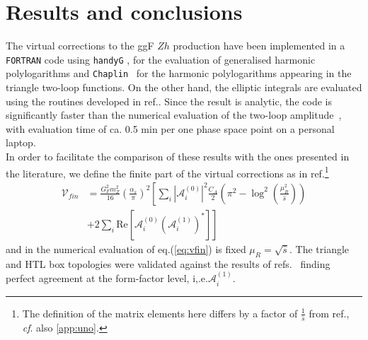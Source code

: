 \section{Results and conclusions} \label{sec:hzres}
The virtual corrections to the ggF $Zh$ production have been implemented in a  \texttt{FORTRAN} code using  \texttt{handyG} \cite{Naterop:2019xaf}, for the evaluation of generalised harmonic polylogarithms and \texttt{Chaplin}~\cite{Buehler:2011ev} for the harmonic polylogarithms appearing in the triangle two-loop functions. 
On the other hand, the elliptic integrals are evaluated using the routines developed in
ref.\cite{Bonciani:2018uvv}. Since the result is analytic, the code is significantly faster than the numerical evaluation of the two-loop amplitude~\cite{Chen:2020gae}, with evaluation time of ca. 0.5 min per one phase space point on a personal laptop.\\
In order to facilitate the comparison of these results with the ones
presented in the literature, we define the finite part of the virtual corrections
as in
ref.\cite{Davies:2020drs}\footnote{The definition of the matrix elements here
	differs by a factor of
	$\frac{1}{\hat{s}}$ from ref.\cite{Davies:2020drs}, \textit{cf}. also
	\autoref{app:uno}.}
\begin{equation}
	\begin{split}
		\mathcal{V}_{fin}&=\frac{G_F^2 m_Z^2}{16}\left(\frac{\alpha_s}{\pi}\right)^2
		\left[ \sum_{i} \left|\mathcal{A}_i^{(0)} \right|^2\frac{C_A}{2}\left(\pi^2-
		\log^2\left(\frac{\mu_R^2}{\hat{s}}\right)\right)\right. \\
		& \left. +2\sum_i\text{Re}\left[\mathcal{A}_i^{(0)}\left(\mathcal{A}_i^{(1)}\right)^*\right]\right]\,
		\label{eq:vfin}
	\end{split}
\end{equation}
and in the numerical evaluation of eq.(\ref{eq:vfin}) is fixed
$\mu_R= \sqrt{\hat{s}}$.
The triangle and HTL box topologies were validated against the results of refs.~\cite{Hasselhuhn:2016rqt,Davies:2020drs} finding perfect
agreement at the form-factor level, i,.e.$\mathcal{A}_i^{(1)}$. \\

